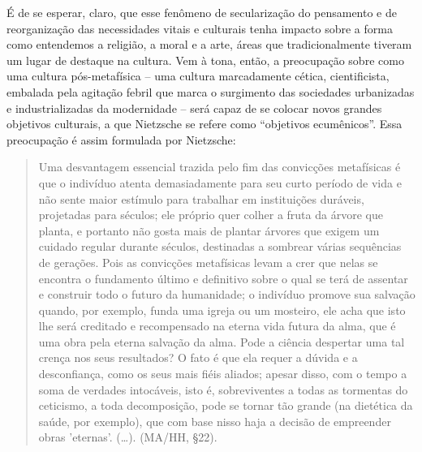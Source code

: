 \documentclass[
	12pt,				%
	openright,			%
	oneside,			%
	a4paper,			%
	english,			%
	french,				%
	spanish,			%
	brazil				%
	]{abntex2}
\begin{document}
É de se esperar, claro, que esse fenômeno de secularização do pensamento e de reorganização das necessidades vitais e culturais tenha impacto sobre a forma como entendemos a religião, a moral e a arte, áreas que tradicionalmente tiveram um lugar de destaque na cultura. Vem à tona, então, a preocupação sobre como uma cultura pós-metafísica – uma cultura marcadamente cética, cientificista, embalada pela agitação febril que marca o surgimento das sociedades urbanizadas e industrializadas da modernidade – será capaz de se colocar novos grandes objetivos culturais, a que Nietzsche se refere como “objetivos ecumênicos”. Essa preocupação é assim formulada por Nietzsche:

\begin{quotation}
Uma desvantagem essencial trazida pelo fim das convicções metafísicas é que o indivíduo atenta demasiadamente para seu curto período de vida e não sente maior estímulo para trabalhar em instituições duráveis, projetadas para séculos; ele próprio quer colher a fruta da árvore que planta, e portanto não gosta mais de plantar árvores que exigem um cuidado regular durante séculos, destinadas a sombrear várias sequências de gerações. Pois as convicções metafísicas levam a crer que nelas se encontra o fundamento último e definitivo sobre o qual se terá de assentar e construir todo o futuro da humanidade; o indivíduo promove sua salvação quando, por exemplo, funda uma igreja ou um mosteiro, ele acha que isto lhe será creditado e recompensado na eterna vida futura da alma, que é uma obra pela eterna salvação da alma. Pode a ciência despertar uma tal crença nos seus resultados? O fato é que ela requer a dúvida e a desconfiança, como os seus mais fiéis aliados; apesar disso, com o tempo a soma de verdades intocáveis, isto é, sobreviventes a todas as tormentas do ceticismo, a toda decomposição, pode se tornar tão grande (na dietética da saúde, por exemplo), que com base nisso haja a decisão de empreender obras 'eternas'. (…). (MA/HH, §22).
\end{quotation}
\end{document}
